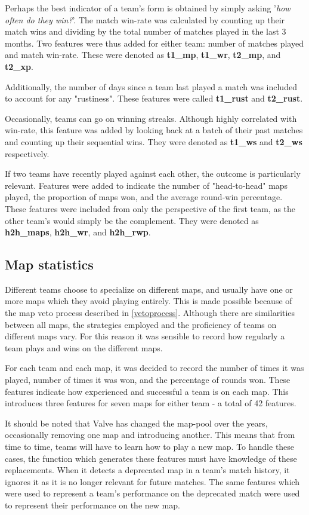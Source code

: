 Perhaps the best indicator of a team's form is obtained by simply asking '\textit{how often do they win?}'. The match win-rate was calculated by counting up their match wins and dividing by the total number of matches played in the last 3 months. Two features were thus added for either team: number of matches played and match win-rate. These were denoted as \textbf{t1\_mp}, \textbf{t1\_wr}, \textbf{t2\_mp}, and \textbf{t2\_xp}. 

Additionally, the number of days since a team last played a match was included to account for any "rustiness". These features were called \textbf{t1\_rust} and \textbf{t2\_rust}.

Occasionally, teams can go on winning streaks. Although highly correlated with win-rate, this feature was added by looking back at a batch of their past matches and counting up their sequential wins. They were denoted as \textbf{t1\_ws} and \textbf{t2\_ws} respectively. 

If two teams have recently played against each other, the outcome is particularly relevant. Features were added to indicate the number of "head-to-head" maps played, the proportion of maps won, and the average round-win percentage. These features were included from only the perspective of the first team, as the other team's would simply be the complement. They were denoted as \textbf{h2h\_maps}, \textbf{h2h\_wr}, and \textbf{h2h\_rwp}. 

\subsection{Map statistics}

Different teams choose to specialize on different maps, and usually have one or more maps which they avoid playing entirely. This is made possible because of the map veto process described in \ref{vetoprocess}. Although there are similarities between all maps, the strategies employed and the proficiency of teams on different maps vary. For this reason it was sensible to record how regularly a team plays and wins on the different maps. 

For each team and each map, it was decided to record the number of times it was played, number of times it was won, and the percentage of rounds won. These features indicate how experienced and successful a team is on each map. This introduces three features for seven maps for either team - a total of 42 features. 

It should be noted that Valve has changed the map-pool over the years, occasionally removing one map and introducing another. This means that from time to time, teams will have to learn how to play a new map. To handle these cases, the function which generates these features must have knowledge of these replacements. When it detects a deprecated map in a team's match history, it ignores it as it is no longer relevant for future matches. The same features which were used to represent a team's performance on the deprecated match were used to represent their performance on the new map.

